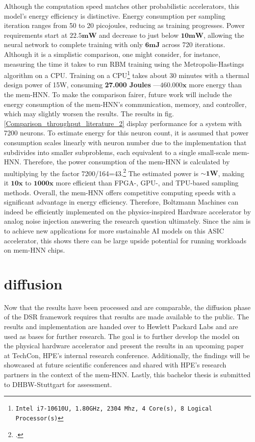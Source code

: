 Although the computation speed matches other probabilistic accelerators, this model's energy efficiency is distinctive.
Energy consumption per sampling iteration ranges from 50 to 20 picojoules, reducing as training progresses.
Power requirements start at \(\mathbf{22.5mW}\) and decrease to just below \(\mathbf{10mW}\), allowing the neural network to complete training with only 
\(\mathbf{6 mJ}\) across 720 iterations.
Although it is a simplistic comparison, one might consider, for instance, measuring the time it takes to run RBM training using the Metropolis-Hastings algorithm on a \ac{CPU}.
Training on a CPU\footnote{\texttt{Intel i7-10610U, 1.80GHz, 2304 Mhz, 4 Core(s), 8 Logical Processor(s)}} takes about 30 minutes with a thermal design power of 15W, consuming \textbf{27.000 Joules}
—\(\mathbf{460.000x}\) more energy than the \ac{mem-HNN}.
To make the comparison fairer, future work will include the energy consumption of the \ac{mem-HNN}'s communication, memory, and controller, which may slightly worsen the results.
The results in fig.\ref{Comparison_throughput_literature_2} display performance for a system with 7200 neurons.
To estimate energy for this neuron count, it is assumed that power consumption scales linearly with neuron number due to the implementation that subdivides into smaller subproblems, each equivalent to a single small-scale \ac{mem-HNN}.
Therefore, the power consumption of the \ac{mem-HNN} is calculated by multiplying by the factor 7200/164=43.\footcite[cf.][2]{aaditAcceleratingAdaptiveParallel2023}
The estimated power is \(\mathbf{\sim1W}\), making it \(\mathbf{10x}\) to \(\mathbf{1000x}\) more efficient than FPGA-, GPU-, and TPU-based sampling methods.
Overall, the \ac{mem-HNN} offers competitive computing speeds with a significant advantage in energy efficiency.
Therefore, Boltzmann Machines can indeed be efficiently implemented on the physics-inspired Hardware accelerator by analog noise injection answering the research question ultimately. 
Since the aim is to achieve new applications for more sustainable AI models on this \ac{ASIC} accelerator, 
this shows there can be large upside potential for running workloads on \ac{mem-HNN} chips.

\section{diffusion}
Now that the results have been processed and are comparable, the diffusion phase of the \ac{DSR} framework 
requires that results are made available to the public. 
The results and implementation are handed over to Hewlett Packard Labs and are used as 
bases for further research.
The goal is to further develop the model on the physical hardware accelerator and present the results in an upcoming paper at TechCon, HPE's internal research conference.
Additionally, the findings will be showcased at future scientific conferences and shared with HPE's research partners in the context of the \ac{mem-HNN}.
Lastly, this bachelor thesis is submitted to DHBW-Stuttgart for assessment. 
